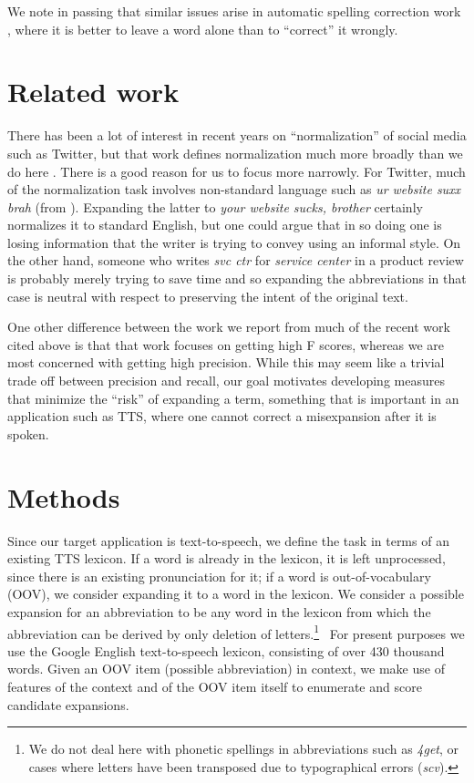 \documentclass[11pt]{article}
\begin{document}
We note in passing that similar issues arise
in automatic spelling correction work \cite{Sourpuss:08}, where it is better to
leave a word alone than to ``correct'' it wrongly.

\vspace{-0.2cm}
\section{Related work}
There has been a lot of interest in recent years on ``normalization'' of social
media such as Twitter, but that work defines normalization much more broadly
than we do here
\cite{xia-wong-li:2006:COLACL,Choudhury:EtAl:07,kobus-yvon-damnati:2008:PAPERS,beaufort-EtAl:2010:ACL,Kaufmann:10,liu-EtAl:2011:ACL-HLT2011,Pennell:Liu:11B,aw-lee:2012:Demo,liu-weng-jiang:2012:ACL2012,liu-EtAl:2012:ACL20122,Hassan:Menezes:13,Yang:Eisenstein:13}. There
is a good reason for us to focus more narrowly. For Twitter, much of the
normalization task involves non-standard language such as \emph{ur website suxx
  brah} (from ). Expanding the latter to
\emph{your website sucks, brother} certainly normalizes it to standard English,
but one could argue that in so doing one is losing information that the
writer is trying to convey using an informal style. On the other hand, someone
who writes \emph{svc ctr} for \emph{service center} in a product review is
probably merely trying to save time and so expanding the abbreviations in that
case is neutral with respect to preserving the intent of the original text.

One other difference between the work we report from much of the recent work
cited above is that that work focuses on getting high F scores, whereas we are
most concerned with getting high precision. While this may seem like a trivial
trade off between precision and recall, our goal motivates developing measures
that minimize the ``risk'' of expanding a term, something that is important in
an application such as TTS, where one cannot correct a misexpansion after it is
spoken.

\vspace{-0.2cm}
\section{Methods}
\label{sec:data}
Since our target application is text-to-speech, we define the task in terms of
an existing TTS lexicon.  If a word is already in the lexicon, it is left
unprocessed, since there is an existing pronunciation for it; if a word is
out-of-vocabulary (OOV), we consider expanding it to a word in the lexicon.  We
consider a possible expansion for an abbreviation to be any word in the lexicon
from which the abbreviation can be derived by only deletion of
letters.\footnote{We do not deal here with phonetic spellings in abbreviations
  such as \emph{4get}, or cases where letters have been transposed due to
  typographical errors (\emph{scv}).}~ For
present purposes we use the Google English text-to-speech lexicon,
consisting of over 430 thousand words. Given an OOV item (possible abbreviation) in
context, we make use of features of the context and of the OOV item itself to
enumerate and score candidate expansions.
\end{document}
